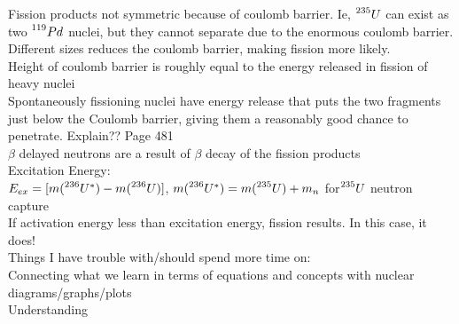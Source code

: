 \documentclass{article}
\begin{document}
\begin{multicols}{3}
Fission products not symmetric because of coulomb barrier.  Ie, $\prescript{235}{}{U}$ can exist as two $\prescript{119}{}{Pd}$ nuclei, but they cannot separate due to the enormous coulomb barrier.  Different sizes reduces the coulomb barrier, making fission more likely.\\
Height of coulomb barrier is roughly equal to the energy released in fission of heavy nuclei\\
Spontaneously fissioning nuclei have energy release that puts the two fragments just below the Coulomb barrier, giving them a reasonably good chance to penetrate.  Explain??  Page 481\\
$\beta$ delayed neutrons are a result of $\beta$ decay of the fission products\\
Excitation Energy:\\
\hspace*{0.01\textwidth} $E_{ex} = [m(\prescript{236}{}{U}^{*}) - m(\prescript{236}{}{U})]$, $m(\prescript{236}{}{U}^{*}) = m(\prescript{235}{}{U}) + m_{n}$ for$\prescript{235}{}{U}$ neutron capture\\

If activation energy less than excitation energy, fission results.  In this case, it does!\\


Things I have trouble with/should spend more time on:\\
\hspace*{0.01\textwidth} Connecting what we learn in terms of equations and concepts with nuclear diagrams/graphs/plots\\
\hspace*{0.01\textwidth} Understanding 


\end{multicols}
\end{document}
